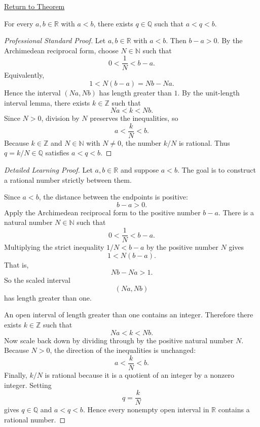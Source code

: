 \newpage
{}
\label{prf:density-of-rationals-in-reals}

\begin{remark*}[Return]
\hyperref[thm:density-of-rationals-in-reals]{Return to Theorem}
\end{remark*}

\begin{theorem*}
For every $a,b\in\mathbb{R}$ with $a<b$, there exists $q\in\mathbb{Q}$ such that $a<q<b$.
\end{theorem*}

\begin{proof}[Professional Standard Proof]
\LRAProofBodyStart
Let $a,b\in\mathbb{R}$ with $a<b$. Then $b-a>0$.
By the Archimedean reciprocal form, choose $N\in\mathbb{N}$ such that
\[
0<\frac{1}{N}<b-a.
\]
Equivalently,
\[
1<N(b-a)=Nb-Na.
\]
Hence the interval $(Na,Nb)$ has length greater than $1$. By the unit-length
interval lemma, there exists $k\in\mathbb{Z}$ such that
\[
Na<k<Nb.
\]
Since $N>0$, division by $N$ preserves the inequalities, so
\[
a<\frac{k}{N}<b.
\]
Because $k\in\mathbb{Z}$ and $N\in\mathbb{N}$ with $N\ne 0$, the number
$k/N$ is rational. Thus $q=k/N\in\mathbb{Q}$ satisfies $a<q<b$.
\end{proof}

\begin{proof}[Detailed Learning Proof]
\LRAProofBodyStart
Let $a,b\in\mathbb{R}$ and suppose $a<b$. The goal is to construct a rational
number strictly between them.

Since $a<b$, the distance between the endpoints is positive:
\[
b-a>0.
\]
Apply the Archimedean reciprocal form to the positive number $b-a$. There is a
natural number $N\in\mathbb{N}$ such that
\[
0<\frac{1}{N}<b-a.
\]
Multiplying the strict inequality $1/N<b-a$ by the positive number $N$ gives
\[
1<N(b-a).
\]
That is,
\[
Nb-Na>1.
\]
So the scaled interval
\[
(Na,Nb)
\]
has length greater than one.

An open interval of length greater than one contains an integer. Therefore
there exists $k\in\mathbb{Z}$ such that
\[
Na<k<Nb.
\]
Now scale back down by dividing through by the positive natural number $N$.
Because $N>0$, the direction of the inequalities is unchanged:
\[
a<\frac{k}{N}<b.
\]
Finally, $k/N$ is rational because it is a quotient of an integer by a nonzero
integer. Setting
\[
q=\frac{k}{N}
\]
gives $q\in\mathbb{Q}$ and $a<q<b$. Hence every nonempty open interval in
$\mathbb{R}$ contains a rational number.
\end{proof}

